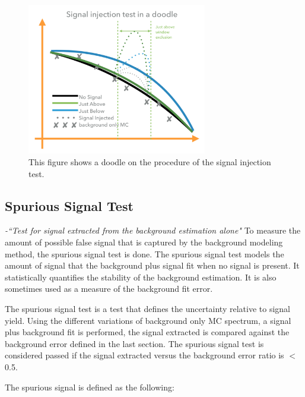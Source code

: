 \begin{figure}[!htb]
    \begin{center}
        \includegraphics[width=0.7\textwidth]{figures/chapter_analysismethod/SignalInjectionTest}
        \caption{
            This figure shows a doodle on the procedure of the signal injection test.
        }
        \label{signalinjection}
    \end{center}
\end{figure}
\FloatBarrier

    \subsection{Spurious Signal Test} 

    \label{sec:spurious}

    \textit{-``Test for signal extracted from the background estimation alone"}
    To measure the amount of possible false signal that is captured by the background modeling method, the spurious signal test is done. The spurious signal test models the amount of signal that the background plus signal fit when no signal is present.  It statistically quantifies the stability of the background estimation. It is also sometimes used as a measure of the background fit error.

The spurious signal test is a test that defines the uncertainty relative to signal yield. Using the different variations of background only MC spectrum, a signal plus background fit is performed, the signal extracted is compared against the background error defined in the last section. The spurious signal test is considered passed if the signal extracted versus the background error ratio is $<$ 0.5.

    The spurious signal is defined as the following:
    
